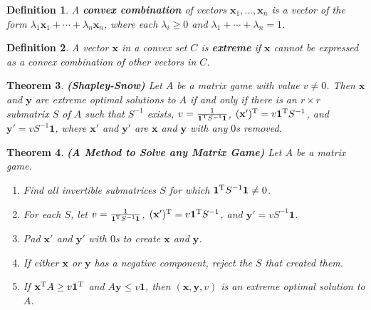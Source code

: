 \documentclass{article}
\theoremstyle{colontheorem}
\newtheorem{theorem}{Theorem}[section]
\newtheorem{definition}[theorem]{Definition}
\newcommand{\T}{^\textnormal{T}}
\newenvironment{Theorem}
{
	\begin{mdframed}[backgroundcolor=TheoremOrange!10]
	\begin{theorem}
}
{
	\end{theorem}
	\end{mdframed}
	
	\vspace{.15in}
}
\newenvironment{Def}
{
	\begin{mdframed}[backgroundcolor=DefGreen!10]
	\begin{definition}
}
{
	\end{definition}
	\end{mdframed}
	
	\vspace{.15in}
}
\begin{document}
\begin{Def}
	
	A \textbf{convex combination} of vectors $\mathbf{x}_1, ..., \mathbf{x}_n$ is a vector of the form $\lambda_1 \mathbf{x}_1 + \cdots + \lambda_n \mathbf{x}_n$, where each $\lambda_i \geq 0$ and $\lambda_1 + \cdots  + \lambda_n = 1$.
	
\end{Def}



\begin{Def}
	
	A vector $\mathbf{x}$ in a convex set $C$ is \textbf{extreme} if $\mathbf{x}$ cannot be expressed as a convex combination of other vectors in $C$.
	
\end{Def}



\begin{Theorem}
	
	\textbf{(Shapley-Snow)} Let $A$ be a matrix game with value $v \neq 0$. Then $\mathbf{x}$ and $\mathbf{y}$ are extreme optimal solutions to $A$ if and only if there is an $r \times r$ submatrix $S$ of $A$ such that $S^{-1}$ exists, $v = \frac{1}{\mathbf{1}\T S^{-1} \mathbf{1}}$, $(\mathbf{x}')\T = v \mathbf{1}\T S^{-1}$, and $\mathbf{y}' = v S^{-1} \mathbf{1}$, where $\mathbf{x}'$ and $\mathbf{y}'$ are $\mathbf{x}$ and $\mathbf{y}$ with any $0$s removed.
	
\end{Theorem}



\begin{Theorem}
	
	\textbf{(A Method to Solve any Matrix Game)} Let $A$ be a matrix game.
	
	\begin{enumerate}
		
		\item Find all invertible submatrices $S$ for which $\mathbf{1}\T S^{-1} \mathbf{1} \neq 0$.
		\item For each $S$, let $v = \frac{1}{\mathbf{1}\T S^{-1} \mathbf{1}}$, $(\mathbf{x}')\T = v \mathbf{1}\T S^{-1}$, and $\mathbf{y}' = v S^{-1} \mathbf{1}$.
		\item Pad $\mathbf{x}'$ and $\mathbf{y}'$ with $0$s to create $\mathbf{x}$ and $\mathbf{y}$.
		\item If either $\mathbf{x}$ or $\mathbf{y}$ has a negative component, reject the $S$ that created them.
		\item If $\mathbf{x}\T A \geq v \mathbf{1}\T$ and $A \mathbf{y} \leq v \mathbf{1}$, then $(\mathbf{x}, \mathbf{y}, v)$ is an extreme optimal solution to $A$.
		
	\end{enumerate}
	
\end{Theorem}
\end{document}
